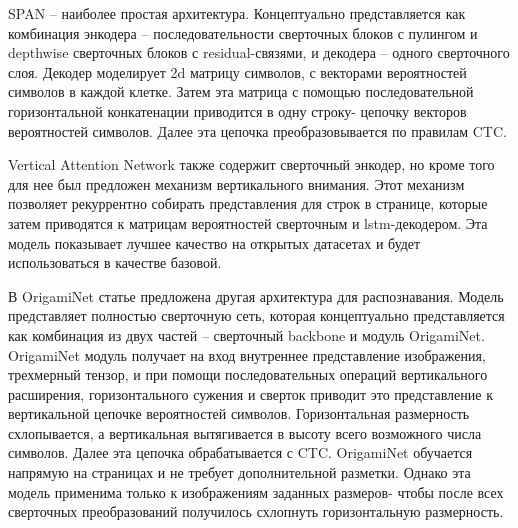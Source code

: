 \documentclass{extarticle}
\begin{document}
\begin{itemize}
	SPAN \cite{SPAN} -- наиболее простая архитектура. Концептуально представляется как комбинация энкодера -- последовательности сверточных блоков с пулингом и depthwise сверточных блоков с residual-связями, и декодера -- одного сверточного слоя.
	Декодер моделирует 2d матрицу символов, с векторами вероятностей символов в
	каждой клетке. Затем эта матрица с помощью последовательной горизонтальной
	конкатенации приводится в одну строку- цепочку векторов вероятностей символов. Далее эта цепочка преобразовывается по правилам CTC.
	
	Vertical Attention Network \cite{VAN} также содержит сверточный энкодер, но кроме того
	для нее был предложен механизм вертикального внимания. Этот механизм позволяет рекуррентно собирать представления для строк в странице, которые затем
	приводятся к матрицам вероятностей сверточным и lstm-декодером. Эта модель
	показывает лучшее качество на открытых датасетах и будет использоваться в качестве базовой.
	
	В OrigamiNet \cite{OrigamiNet} статье предложена другая архитектура для распознавания. Модель представляет полностью сверточную сеть, которая концептуально представляется как комбинация из двух частей -- сверточный backbone и модуль OrigamiNet.
	OrigamiNet модуль получает на вход внутреннее представление изображения, трехмерный тензор, и при помощи последовательных операций вертикального расширения, горизонтального сужения и сверток приводит это представление к вертикальной цепочке вероятностей символов. Горизонтальная размерность схлопывается, а вертикальная вытягивается в высоту всего возможного числа символов.
	Далее эта цепочка обрабатывается с CTC. OrigamiNet обучается напрямую на страницах и не требует дополнительной разметки. Однако эта модель применима только к изображениям заданных размеров- чтобы после всех сверточных преобразований получилось схлопнуть горизонтальную размерность.
\end{itemize}
	
\end{document}
